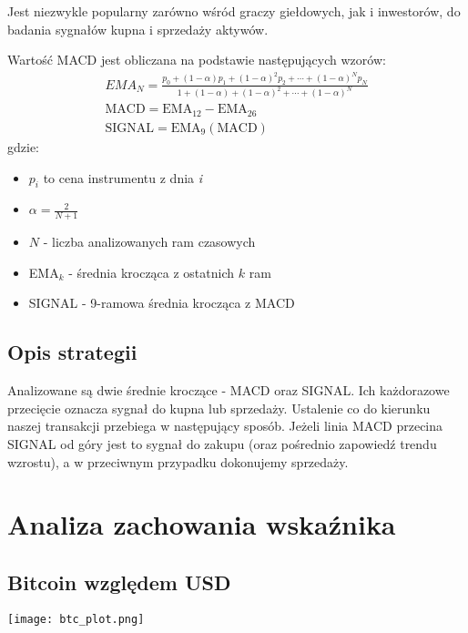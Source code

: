 \documentclass[11pt]{article}
\begin{document}
    Jest niezwykle popularny zarówno wśród graczy giełdowych, jak i inwestorów, do badania sygnałów kupna i sprzedaży aktywów.

    Wartość MACD jest obliczana na podstawie następujących wzorów:
    \begin{gather}
        EMA_N = \frac{p_0 + (1 - \alpha)p_1 + (1-\alpha)^2p_2 + \cdots + (1-\alpha)^Np_N}{1 + (1 - \alpha) + (1-\alpha)^2 + \cdots + (1-\alpha)^N}\\
        \label{eq:wzory}
        \text{MACD} = \text{EMA}_{12} - \text{EMA}_{26}\\
        \label{eq:wzory2}
        \text{SIGNAL} = \text{EMA}_{9}(\text{MACD})
    \end{gather}
    gdzie:
    \begin{itemize}
        \item $p_i$ to cena instrumentu z dnia \textit{i}
        \item $\alpha = \frac{2}{N+1}$
        \item $N$ - liczba analizowanych ram czasowych
        \item EMA$_k$ - średnia krocząca z ostatnich $k$ ram
        \item SIGNAL - 9-ramowa średnia krocząca z MACD
    \end{itemize}

    \subsection{Opis strategii}
    Analizowane są dwie średnie kroczące - MACD oraz SIGNAL. 
    Ich każdorazowe przecięcie oznacza sygnał do kupna lub sprzedaży.
    Ustalenie co do kierunku naszej transakcji przebiega w następujący sposób. Jeżeli linia MACD przecina SIGNAL od góry jest to sygnał do zakupu (oraz pośrednio zapowiedź trendu wzrostu), a w przeciwnym przypadku dokonujemy sprzedaży.


    \section{Analiza zachowania wskaźnika}

    \subsection{Bitcoin względem USD}
    \begin{center}\hypertarget{png:btcusd}{}
        \texttt{[image: btc\_plot.png]}
    \end{center}
    
\end{document}
